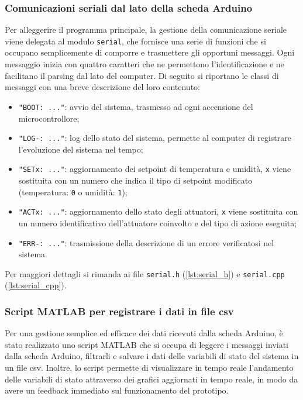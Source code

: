 \subsubsection{Comunicazioni seriali dal lato della scheda Arduino}
Per alleggerire il programma principale, la gestione della comunicazione seriale viene delegata al modulo \verb|serial|,
che fornisce una serie di funzioni che si occupano semplicemente di comporre e trasmettere gli opportuni messaggi. Ogni
messaggio inizia con quattro caratteri che ne permettono l'identificazione e ne facilitano il parsing dal lato del computer.
Di seguito si riportano le classi di messaggi con una breve descrizione del loro contenuto:
\begin{itemize}
	\item \verb|"BOOT: ..."|: avvio del sistema, trasmesso ad ogni accensione del microcontrollore;
	\item \verb|"LOG-: ..."|: log dello stato del sistema, permette al computer di registrare l'evoluzione del sistema nel tempo;
	\item \verb|"SETx: ..."|: aggiornamento dei setpoint di temperatura e umidità, \verb|x| viene sostituita con un numero che
	indica il tipo di setpoint modificato (temperatura: \verb|0| o umidità: \verb|1|);
	\item \verb|"ACTx: ..."|: aggiornamento dello stato degli attuatori, \verb|x| viene sostituita con un numero identificativo
	dell'attuatore coinvolto e del tipo di azione eseguita;
	\item \verb|"ERR-: ..."|: trasmissione della descrizione di un errore verificatosi nel sistema.
\end{itemize}
Per maggiori dettagli si rimanda ai file \verb|serial.h| (\autoref{lst:serial_h}) e \verb|serial.cpp|
(\autoref{lst:serial_cpp}).

\subsubsection{Script MATLAB per registrare i dati in file csv}
Per una gestione semplice ed efficace dei dati ricevuti dalla scheda Arduino, è stato realizzato uno script MATLAB che si
occupa di leggere i messaggi inviati dalla scheda Arduino, filtrarli e salvare i dati delle variabili di stato del sistema
in un file csv. Inoltre, lo script permette di visualizzare in tempo reale l'andamento delle variabili di stato attraverso
dei grafici aggiornati in tempo reale, in modo da avere un feedback immediato sul funzionamento del prototipo.

